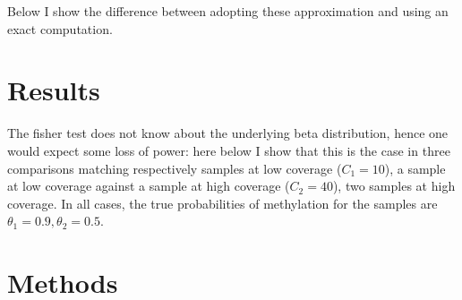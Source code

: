\documentclass{amsart}
\begin{document}
Below I show the difference between adopting these approximation and using an exact computation.
\section{Results} 
The fisher  test does not know about the underlying beta distribution, hence one would expect some loss of power: here below I show that this is the case in three  comparisons matching respectively samples at low coverage ($C_1=10$), a sample at low coverage  against a sample at high coverage ($C_2=40$), two samples at high coverage. In all cases, the true probabilities of methylation for the samples are $\theta_1=0.9,\theta_2=0.5$.
\section{Methods}
\end{document}
